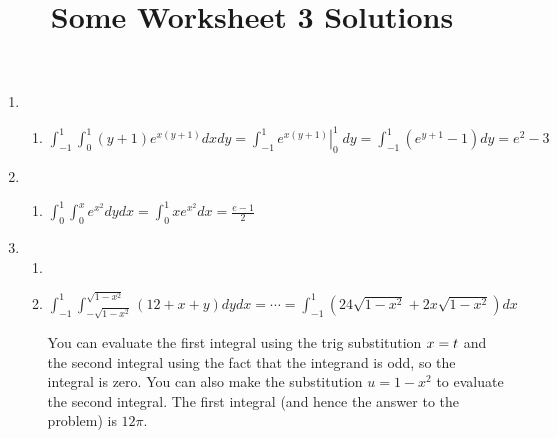 \documentclass[12pt]{article}
\title{Some Worksheet 3 Solutions}
\author{}\date{}
\let\sin\relax\DeclareMathOperator{\sin}{\mathsf{sin}}
\begin{document}
\maketitle
\thispagestyle{empty}

\begin{enumerate}
\item
\begin{enumerate}
\item $\int_{-1}^1\int_0^1\left(y+1\right)e^{x\left(y+1\right)}dxdy
=\int_{-1}^1\left.e^{x\left(y+1\right)}\right|_0^1\;dy
=\int_{-1}^1\left(e^{y+1}-1\right)dy=e^2-3$
\end{enumerate}
\item
\begin{enumerate}
\item $\int_0^1\int_0^xe^{x^2}dydx
=\int_0^1xe^{x^2}dx=\frac{e-1}{2}$
\end{enumerate}
\item
\begin{enumerate}
\item
\item $\int_{-1}^1\int_{-\sqrt{1-x^2}}^{\sqrt{1-x^2}}
\left(12+x+y\right)dydx
=\cdots
=\int_{-1}^1\left(24\sqrt{1-x^2}+2x\sqrt{1-x^2}\right)dx$

You can evaluate the first integral using the trig substitution $x=\sin{t}$
and the second integral using the fact
that the integrand is odd, so the integral is zero.
You can also make the substitution $u=1-x^2$ to evaluate the second integral.
The first integral (and hence the answer to the problem) is $12\pi$.
\end{enumerate}
\end{enumerate}
\end{document}
